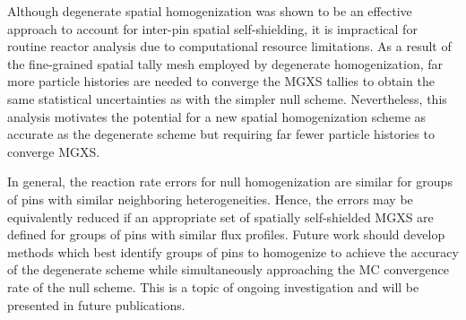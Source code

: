Although degenerate spatial homogenization was shown to be an effective approach to account for inter-pin spatial self-shielding, it is impractical for routine reactor analysis due to computational resource limitations. As a result of the fine-grained spatial tally mesh employed by degenerate homogenization, far more particle histories are needed to converge the MGXS tallies to obtain the same statistical uncertainties as with the simpler null scheme. Nevertheless, this analysis motivates the potential for a new spatial homogenization scheme as accurate as the degenerate scheme but requiring far fewer particle histories to converge MGXS.

In general, the reaction rate errors for null homogenization are similar for groups of pins with similar neighboring heterogeneities. Hence, the errors may be equivalently reduced if an appropriate set of spatially self-shielded MGXS are defined for groups of pins with similar flux profiles. Future work should develop methods which best identify groups of pins to homogenize to achieve the accuracy of the degenerate scheme while simultaneously approaching the MC convergence rate of the null scheme. This is a topic of ongoing investigation and will be presented in future publications.
